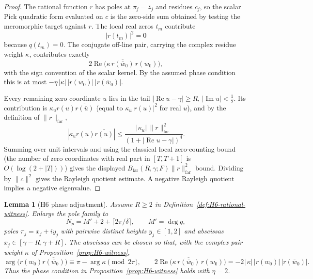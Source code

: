 \documentclass[11pt]{amsart}
\newtheorem{lemma}[theorem]{Lemma}
\theoremstyle{definition}
\theoremstyle{remark}
\theoremstyle{definition}
\renewcommand{\Re}{\operatorname{Re}}
\renewcommand{\Im}{\operatorname{Im}}
\newcommand{\half}{\tfrac{1}{2}}
\begin{document}
\begin{proof}
The rational function $r$ has poles at $\pi_j=\bar z_j$ and residues $c_j$, so the scalar Pick
quadratic form evaluated on $c$ is the zero-side sum obtained by testing the meromorphic target against
$r$.  The local real zeros $t_m$ contribute
\[
   |r(t_m)|^2=0
\]
because $q(t_m)=0$.  The conjugate off-line pair, carrying the complex residue weight $\kappa$, contributes exactly
\[
   2\Re\bigl(\kappa\,\overline{r(\bar w_0)}\,r(w_0)\bigr),
\]
with the sign convention of the scalar kernel.  By the assumed phase condition this is at most
$-\eta\,|\kappa|\,|r(w_0)|\,|r(\bar w_0)|$.

Every remaining zero coordinate $u$ lies in the tail $|\Re u-\gamma|\ge R$, $|\Im u|<\half$.  Its
contribution is $\kappa_u r(u)\overline{r(\bar u)}$ (equal to $\kappa_u|r(u)|^2$ for real $u$), and
by the definition of $\|r\|_{\mathrm{far}}$,
\[
   |\kappa_u r(u)\overline{r(\bar u)}|\le
   \frac{|\kappa_u|\,\|r\|_{\mathrm{far}}^2}{(1+|\Re u-\gamma|)^4}.
\]
Summing over unit intervals and using the classical local zero-counting bound (the number of zero coordinates with real part in
$[T,T+1]$ is $O(\log(2+|T|))$) gives the displayed
$B_{\mathrm{far}}(R,\gamma;F)\|r\|_{\mathrm{far}}^2$ bound.  Dividing by $\|c\|^2$ gives the Rayleigh
quotient estimate.  A negative Rayleigh quotient implies a negative eigenvalue.
\end{proof}

\begin{lemma}[H6 phase adjustment]\label{lem:H6-phase}
Assume $R\ge2$ in Definition~\ref{def:H6-rational-witness}.  Enlarge the pole family to
\[
   N_p=M'+2+\lceil2\pi/\delta\rceil,\qquad M'=\deg q,
\]
poles $\pi_j=x_j+iy_j$ with pairwise distinct heights $y_j\in[1,2]$ and abscissas
$x_j\in[\gamma-R,\gamma+R]$.  The abscissas can be chosen so that, with the complex pair weight $\kappa$ of
Proposition~\ref{prop:H6-witness},
\[
   \arg\bigl(r(w_0)\overline{r(\bar w_0)}\bigr)\equiv\pi-\arg\kappa\pmod{2\pi},
   \qquad
   2\Re\bigl(\kappa\,\overline{r(\bar w_0)}\,r(w_0)\bigr)
   =
   -2\,|\kappa|\,|r(w_0)|\,|r(\bar w_0)|.
\]
Thus the phase condition in
Proposition~\ref{prop:H6-witness} holds with $\eta=2$.
\end{lemma}
\end{document}
